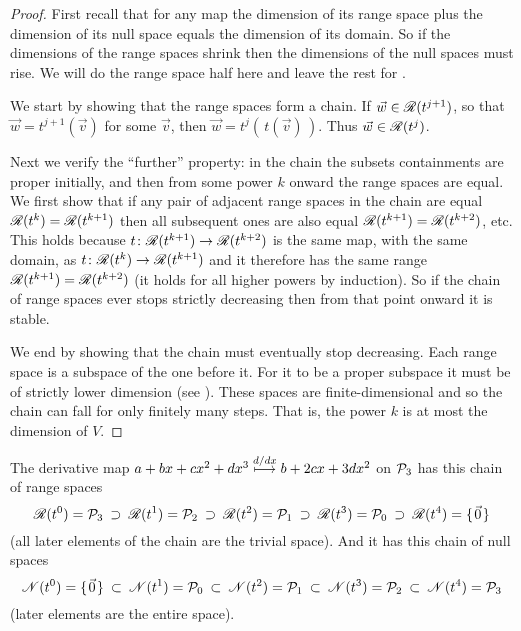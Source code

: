 \begin{proof}
First recall that for any map the dimension of its range space
plus the dimension of its null space equals
the dimension of its domain.
So if the dimensions of the range spaces shrink then the 
dimensions of the null spaces must rise.
We will do the range space half here and leave the rest for
.

We start by showing 
that the range spaces form a chain.
If $\vec{w}\in\mathscr{R}(t^{j+1})$, so that
$\vec{w}=t^{j+1}(\vec{v})$ for some $\vec{v}$, 
then $\vec{w}=t^{j}(\,t(\vec{v})\,)$.
Thus $\vec{w}\in\mathscr{R}(t^{j})$.

Next we verify the ``further'' property:
in the chain the subsets containments are proper 
initially, and then from some power $k$ onward the range spaces are equal. 
We first show that if any pair of adjacent range spaces in the
chain are equal \( \mathscr{R}(t^{k})=\mathscr{R}(t^{k+1}) \)
then all subsequent ones are also equal
\( \mathscr{R}(t^{k+1})=\mathscr{R}(t^{k+2}) \), etc.
This holds because
\( \mbox{$t\colon \mathscr{R}(t^{k+1})\to \mathscr{R}(t^{k+2})$} \)
is the same map, with the same domain, as
\( \mbox{$t\colon \mathscr{R}(t^{k})\to \mathscr{R}(t^{k+1})$} \) and
it therefore has the same range
\( \mathscr{R}(t^{k+1})=\mathscr{R}(t^{k+2}) \)
(it holds for all higher powers by induction).
So if the chain of range spaces ever stops strictly decreasing then
from that point onward it is stable.

We end by showing that the chain must eventually stop decreasing. 
Each range space is a subspace of the one before it.
For it to be a proper subspace it must be of strictly lower dimension
(see ).
These spaces are finite-dimensional and so the chain can fall for only
finitely many steps.
That is, the power $k$ is at most the dimension of $V$.
\end{proof}

\begin{example}
The derivative map $a+bx+cx^2+dx^3\stackrel{d/dx}{\longmapsto} b+2cx+3dx^2$
on $\mathcal{P}_3$ has this chain of range spaces
\begin{equation*}
  \mathscr{R}(t^0)=\mathcal{P}_3
    \:\supset\:\mathscr{R}(t^1)=\mathcal{P}_2
    \:\supset\:\mathscr{R}(t^2)=\mathcal{P}_1
    \:\supset\:\mathscr{R}(t^3)=\mathcal{P}_0
    \:\supset\:\mathscr{R}(t^4)=\mbox{$\{\hspace{0.1em}\vec{0}\hspace{0.1em}\}$}
\end{equation*}
(all later elements of the chain are the trivial space). 
And it has this chain of null spaces
\begin{equation*}
  \mathscr{N}(t^0)=\mbox{$\{\hspace{0.1em}\vec{0}\hspace{0.1em}\}$}
  \:\subset\: \mathscr{N}(t^1)=\mathcal{P}_0
  \:\subset\:\mathscr{N}(t^2)=\mathcal{P}_1
  \:\subset\:\mathscr{N}(t^3)=\mathcal{P}_2
  \:\subset\:\mathscr{N}(t^4)=\mathcal{P}_3
\end{equation*}
(later elements are the entire space).
\end{example}

